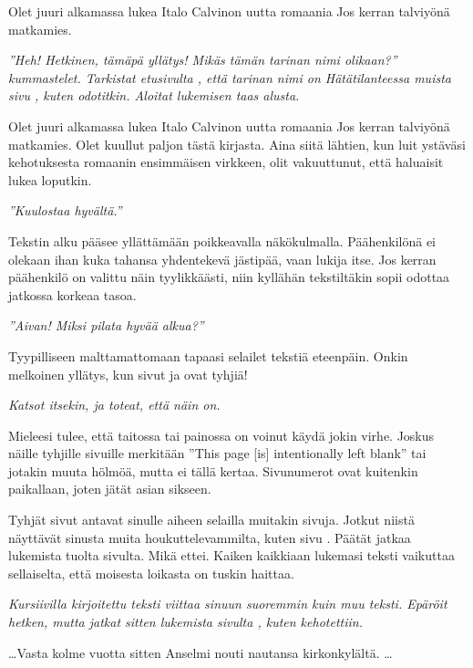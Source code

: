 \documentclass[a4paper, 12pt, finnish]{article}
\title{\mytitle}
\author{Dresa}
\date{\today}
\newcommand{\reader}[1]{\emph{#1}}
\newcommand{\q}[1]{''#1''}
\def\mytitle{Hätätilanteessa muista sivu \pageref{intermission}}  %
\def\beginning{Olet juuri alkamassa lukea Italo Calvinon uutta romaania
Jos kerran talviyönä matkamies. }
\begin{document}
\maketitle\label{titlekey}

\beginning

\reader{\q{Heh! Hetkinen, tämäpä yllätys! Mikäs tämän tarinan
nimi olikaan?} kummastelet. Tarkistat etusivulta
\pageref{titlekey}, että tarinan nimi on \mytitle,
kuten odotitkin. Aloitat lukemisen taas alusta.}
 
\beginning
Olet kuullut paljon tästä
kirjasta. Aina siitä lähtien, kun luit ystäväsi kehotuksesta
romaanin ensimmäisen virkkeen, olit vakuuttunut, että haluaisit
lukea loputkin.  

\reader{\q{Kuulostaa hyvältä.}}

Tekstin alku pääsee yllättämään poikkeavalla näkökulmalla.
Päähenkilönä ei olekaan ihan kuka tahansa yhdentekevä
jästipää, vaan lukija itse. Jos kerran päähenkilö on valittu
näin tyylikkäästi, niin kyllähän tekstiltäkin sopii
odottaa jatkossa korkeaa tasoa.

\reader{\q{Aivan! Miksi pilata hyvää alkua?}}

Tyypilliseen malttamattomaan tapaasi selailet tekstiä eteenpäin.
Onkin melkoinen yllätys, kun sivut \pageref{emptypage1} ja \pageref{emptypage2} ovat tyhjiä!

\reader{Katsot itsekin, ja toteat, että näin on.}

Mieleesi tulee, että taitossa tai painossa on voinut käydä
jokin virhe. Joskus näille tyhjille sivuille merkitään
\q{This page [is] intentionally left blank} tai jotakin
muuta hölmöä, mutta ei tällä kertaa. Sivunumerot ovat
kuitenkin paikallaan, joten jätät asian sikseen.

Tyhjät sivut antavat sinulle aiheen selailla muitakin sivuja.
Jotkut niistä näyttävät sinusta muita houkuttelevammilta,
kuten sivu \pageref{aatelinen}. Päätät jatkaa lukemista
tuolta sivulta. Mikä ettei. Kaiken kaikkiaan lukemasi
teksti vaikuttaa
sellaiselta, että moisesta loikasta on tuskin haittaa.

\reader{Kursiivilla kirjoitettu teksti viittaa
sinuun suoremmin kuin muu teksti. Epäröit hetken,
mutta jatkat sitten lukemista sivulta \pageref{aatelinen},
kuten kehotettiin.}
\label{etusivu}


\newpage
\mbox{}\label{weirdpage}


\dots  Vasta kolme vuotta sitten Anselmi nouti
nautansa kirkonkylältä. \dots
\end{document}

